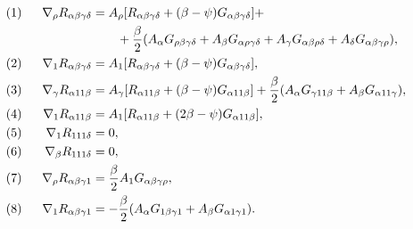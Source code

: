\begin{alignat}{2}


(1&) &\ \; \nabla_\rho R_{\alpha\beta\gamma\delta}&= 


A_\rho[R_{\alpha\beta\gamma\delta}+(\beta-\psi) 


G_{\alpha\beta\gamma\delta}]+\notag\\ 


& &\ \; &\qquad+\frac{\beta}{2}(A_\alpha G_{\rho\beta\gamma\delta}+ 


A_\beta G_{\alpha\rho\gamma\delta}+ 


A_\gamma G_{\alpha\beta\rho\delta}+ 


A_\delta G_{\alpha\beta\gamma\rho}),\notag\\ 


(2&) &\ \; \nabla_1 R_{\alpha\beta\gamma\delta}&= 


A_1[R_{\alpha\beta\gamma\delta}+(\beta-\psi) 


G_{\alpha\beta\gamma\delta}],\notag\\ 


(3&) &\ \; \nabla_\gamma R_{\alpha 11\beta}&= 


A_\gamma[R_{\alpha 11\beta}+(\beta-\psi) 


G_{\alpha 11\beta}]+\frac{\beta}{2}(A_\alpha 


G_{\gamma 11\beta}+A_\beta G_{\alpha 11\gamma}),\notag\\ 


(4&) &\ \; \nabla_1 R_{\alpha 11\beta}&= 


A_1[R_{\alpha 11\beta}+(2\beta-\psi) 


G_{\alpha 11\beta}],\\ 


(5&) &\ \; \nabla_1 R_{111\delta}&=0,\notag\\ 


(6&) &\ \; \nabla_\beta R_{111\delta}&=0,\notag\\ 


(7&) &\ \; \nabla_\rho R_{\alpha\beta\gamma 1}&= 


\frac{\beta}{2}A_1 G_{\alpha\beta\gamma\rho},\notag\\ 


(8&) &\ \; \nabla_1 R_{\alpha\beta\gamma 1}&= 


-\frac{\beta}{2}(A_\alpha G_{1\beta\gamma 1}+ 


A_\beta G_{\alpha 1\gamma 1}).\notag


\end{alignat} 


